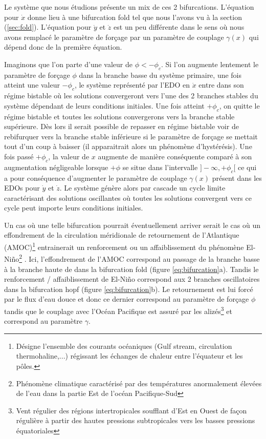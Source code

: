 Le système que nous étudions présente un mix de ces 2 bifurcations. L'équation pour $\dot{x}$ donne lieu à une bifurcation fold tel que nous l'avons vu à la section (\ref{sec:fold}). L'équation pour $\dot{y}$ et $\dot{z}$ est un peu différente dans le sens où nous avons remplacé le paramètre de forçage par un paramètre de couplage $\gamma(x)$ qui dépend donc de la première équation.


Imaginons que l’on parte d’une valeur de $\phi < - \phi_c$. Si l’on augmente lentement le paramètre de forçage $\phi$ dans la branche basse du système primaire, une fois atteint une valeur $-\phi_c$, le système représenté par l’EDO en $\dot{x}$ entre dans son régime bistable où les solutions convergeront vers l’une des 2 branches stables du système dépendant de leurs conditions initiales. Une fois atteint $+\phi_c$, on quitte le régime bistable et toutes les solutions convergerons vers la branche stable supérieure. Dès lors il serait possible de repasser en régime bistable voir de rebifurquer vers la branche stable inférieure si le paramètre de forçage se mettait tout d’un coup à baisser (il apparaitrait alors un phénomène d’hystérésis). Une fois passé $+\phi_c$, la valeur de $x$ augmente de manière conséquente comparé à son augmentation négligeable lorsque $+\phi$ se situe dans l’intervalle $]-\infty, +\phi_c[$ ce qui a pour conséquence d’augmenter le paramètre de couplage $\gamma(x)$ présent dans les EDOs pour $\dot{y}$ et $\dot{z}$.  Le système génère alors par cascade un cycle limite caractérisant des solutions oscillantes où toutes les solutions convergent vers ce cycle peut importe leurs conditions initiales.

Un cas où une telle bifurcation pourrait éventuellement arriver serait le cas où un effondrement de la circulation méridionale de retournement de l'Atlantique (AMOC)\footnote{Désigne l'ensemble des courants océaniques (Gulf stream, circulation thermohaline,...) régissant les échanges de chaleur entre l'équateur et les pôles.} entrainerait un renforcement ou un affaiblissement du phénomène El-Niño\footnote{Phénomène climatique caractérisé par des températures anormalement élevées de l'eau dans la partie Est de l'océan Pacifique-Sud} \cite{timmermann_influence_2007}. Ici, l'effondrement de l'AMOC correspond au passage de la branche basse à la branche haute de dans la bifurcation fold (figure \ref{eq:bifurcation}a). Tandis le renforcement / affaiblissement de El-Niño correspond aux 2 branches oscillatoires dans la bifurcation hopf (figure \ref{eq:bifurcation}b). Le retournement est lui forcé par le flux d'eau douce et donc ce dernier correspond au paramètre de forçage $\phi$ tandis que le couplage avec l'Océan Pacifique est assuré par les alizés\footnote{Vent régulier des régions intertropicales soufflant d'Est en Ouest de façon régulière à partir des hautes pressions subtropicales vers les basses pressions équatoriales} et correspond au paramètre $\gamma$.

